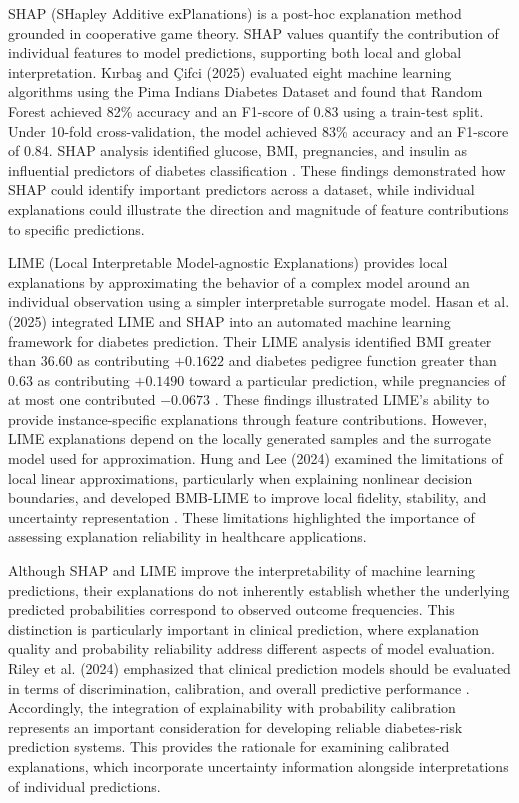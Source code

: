 SHAP (SHapley Additive exPlanations) is a post-hoc explanation method grounded in cooperative game theory. SHAP values quantify the contribution of individual features to model predictions, supporting both local and global interpretation. K{\i}rba{\c{s}} and {\c{C}}ifci (2025) evaluated eight machine learning algorithms using the Pima Indians Diabetes Dataset and found that Random Forest achieved 82\% accuracy and an F1-score of 0.83 using a train-test split. Under 10-fold cross-validation, the model achieved 83\% accuracy and an F1-score of 0.84. SHAP analysis identified glucose, BMI, pregnancies, and insulin as influential predictors of diabetes classification \cite{kirbas_cifci_shap_2025}. These findings demonstrated how SHAP could identify important predictors across a dataset, while individual explanations could illustrate the direction and magnitude of feature contributions to specific predictions.

LIME (Local Interpretable Model-agnostic Explanations) provides local explanations by approximating the behavior of a complex model around an individual observation using a simpler interpretable surrogate model. Hasan et al. (2025) integrated LIME and SHAP into an automated machine learning framework for diabetes prediction. Their LIME analysis identified BMI greater than 36.60 as contributing $+0.1622$ and diabetes pedigree function greater than 0.63 as contributing $+0.1490$ toward a particular prediction, while pregnancies of at most one contributed $-0.0673$ \cite{hasan_automl_xai_2025}. These findings illustrated LIME's ability to provide instance-specific explanations through feature contributions. However, LIME explanations depend on the locally generated samples and the surrogate model used for approximation. Hung and Lee (2024) examined the limitations of local linear approximations, particularly when explaining nonlinear decision boundaries, and developed BMB-LIME to improve local fidelity, stability, and uncertainty representation \cite{hung_lee_lime_2024}. These limitations highlighted the importance of assessing explanation reliability in healthcare applications.

Although SHAP and LIME improve the interpretability of machine learning predictions, their explanations do not inherently establish whether the underlying predicted probabilities correspond to observed outcome frequencies. This distinction is particularly important in clinical prediction, where explanation quality and probability reliability address different aspects of model evaluation. Riley et al. (2024) emphasized that clinical prediction models should be evaluated in terms of discrimination, calibration, and overall predictive performance \cite{riley_validation_2024}. Accordingly, the integration of explainability with probability calibration represents an important consideration for developing reliable diabetes-risk prediction systems. This provides the rationale for examining calibrated explanations, which incorporate uncertainty information alongside interpretations of individual predictions.

